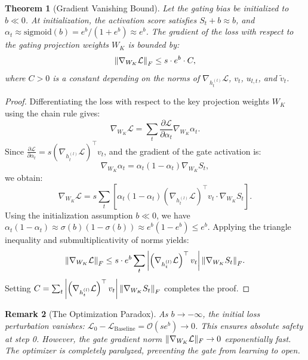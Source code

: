 \documentclass[11pt]{article}
\newtheorem{theorem}{Theorem}[section]
\newtheorem{remark}[theorem]{Remark}
\newcommand{\sigmoid}{\mathrm{sigmoid}}
\DeclarePairedDelimiter{\norm}{\lVert}{\rVert}
\begin{document}
\begin{theorem}[Gradient Vanishing Bound]
Let the gating bias be initialized to $b \ll 0$. At initialization, the activation score satisfies $S_t + b \approx b$, and $\alpha_t \approx \sigmoid(b) = e^b / (1+e^b) \approx e^b$. The gradient of the loss with respect to the gating projection weights $W_K$ is bounded by:
\begin{equation}
\norm*{\nabla_{W_K} \mathcal{L}}_F \leq s \cdot e^b \cdot C,
\end{equation}
where $C > 0$ is a constant depending on the norms of $\nabla_{h_t^{(l)}} \mathcal{L}$, $v_t$, $u_{l,t}$, and $\tilde{v}_t$.
\end{theorem}

\begin{proof}
Differentiating the loss with respect to the key projection weights $W_K$ using the chain rule gives:
\begin{equation}
\nabla_{W_K} \mathcal{L} = \sum_t \frac{\partial \mathcal{L}}{\partial \alpha_t} \nabla_{W_K} \alpha_t.
\end{equation}
Since $\frac{\partial \mathcal{L}}{\partial \alpha_t} = s \left( \nabla_{h_t^{(l)}} \mathcal{L} \right)^\top v_t$, and the gradient of the gate activation is:
\begin{equation}
\nabla_{W_K} \alpha_t = \alpha_t (1 - \alpha_t) \nabla_{W_K} S_t,
\end{equation}
we obtain:
\begin{equation}
\nabla_{W_K} \mathcal{L} = s \sum_t \left[ \alpha_t(1-\alpha_t) \left( \nabla_{h_t^{(l)}} \mathcal{L} \right)^\top v_t \cdot \nabla_{W_K} S_t \right].
\end{equation}
Using the initialization assumption $b \ll 0$, we have $\alpha_t(1-\alpha_t) \approx \sigma(b)(1-\sigma(b)) \approx e^b (1-e^b) \leq e^b$. Applying the triangle inequality and submultiplicativity of norms yields:
\begin{equation}
\norm*{\nabla_{W_K} \mathcal{L}}_F \leq s \cdot e^b \sum_t \left| \left( \nabla_{h_t^{(l)}} \mathcal{L} \right)^\top v_t \right| \norm*{\nabla_{W_K} S_t}_F.
\end{equation}
Setting $C = \sum_t \left| \left( \nabla_{h_t^{(l)}} \mathcal{L} \right)^\top v_t \right| \norm*{\nabla_{W_K} S_t}_F$ completes the proof.
\end{proof}

\begin{remark}[The Optimization Paradox]
As $b \to -\infty$, the initial loss perturbation vanishes: $\mathcal{L}_0 - \mathcal{L}_{\text{Baseline}} = \mathcal{O}(s e^b) \to 0$. This ensures absolute safety at step 0. However, the gate gradient norm $\norm{\nabla_{W_K} \mathcal{L}}_F \to 0$ exponentially fast. The optimizer is completely paralyzed, preventing the gate from learning to open.
\end{remark}
\end{document}
